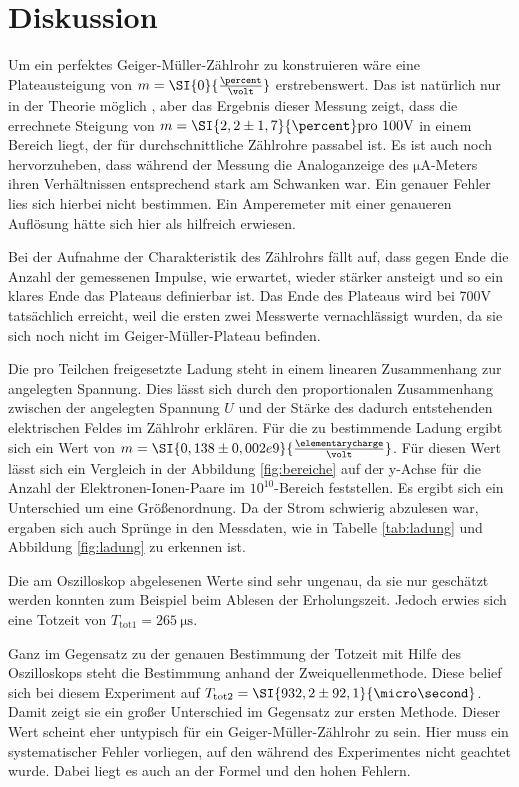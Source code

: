 \section{Diskussion}
\label{sec:Diskussion}
Um ein perfektes Geiger-Müller-Zählrohr zu konstruieren wäre eine Plateausteigung von $m = \SI{0}{\frac{\percent}{\volt}}$ erstrebenswert. Das ist natürlich nur in der Theorie möglich , aber das Ergebnis dieser Messung zeigt, dass die errechnete Steigung von $m = \SI{2,2 \pm 1,7}{\percent} \text{pro 100V}$ in einem Bereich liegt, der für durchschnittliche Zählrohre passabel ist. Es ist auch noch hervorzuheben, dass während der Messung die Analoganzeige des $\si{\micro\ampere}$-Meters ihren Verhältnissen entsprechend stark am Schwanken war. Ein genauer Fehler lies sich hierbei nicht bestimmen. Ein Amperemeter mit einer genaueren Auflösung hätte sich hier als hilfreich erwiesen. 

Bei der Aufnahme der Charakteristik des Zählrohrs fällt auf, dass gegen Ende die Anzahl der gemessenen Impulse, wie erwartet, wieder stärker ansteigt und so ein klares Ende das Plateaus definierbar ist. Das Ende des Plateaus wird bei 700V tatsächlich erreicht, weil die ersten zwei Messwerte vernachlässigt wurden, da sie sich noch nicht im Geiger-Müller-Plateau befinden.

Die pro Teilchen freigesetzte Ladung steht in einem linearen Zusammenhang zur angelegten Spannung. Dies lässt sich durch den proportionalen Zusammenhang zwischen der angelegten Spannung $U$ und der Stärke des dadurch entstehenden elektrischen Feldes im Zählrohr erklären. 
Für die zu bestimmende Ladung ergibt sich ein Wert von $m = \SI{0,138 \pm 0,002 e9}{\frac{\elementarycharge}{\volt}}$. Für diesen Wert lässt sich ein Vergleich in der Abbildung \ref{fig:bereiche} auf der y-Achse für die Anzahl der Elektronen-Ionen-Paare im $10^{10}$-Bereich feststellen. Es ergibt sich ein Unterschied um eine Größenordnung. Da der Strom schwierig abzulesen war, ergaben sich auch Sprünge in den Messdaten, wie in Tabelle \ref{tab:ladung} und Abbildung \ref{fig:ladung} zu erkennen ist. 

Die am Oszilloskop abgelesenen Werte sind sehr ungenau, da sie nur geschätzt werden konnten zum Beispiel beim Ablesen der Erholungszeit. 
Jedoch erwies sich eine Totzeit von $T_\text{tot1} = \SI{265}{\micro\second}$.

Ganz im Gegensatz zu der genauen Bestimmung der Totzeit mit Hilfe des Oszilloskops steht die Bestimmung anhand der Zweiquellenmethode. Diese belief sich bei diesem Experiment auf $T_\text{tot2} = \SI{932,2 \pm 92,1}{\micro\second}$. Damit zeigt sie ein großer Unterschied im Gegensatz zur ersten Methode. Dieser Wert scheint eher untypisch für ein Geiger-Müller-Zählrohr zu sein. Hier muss ein systematischer Fehler vorliegen, auf den während des Experimentes nicht geachtet wurde. Dabei liegt es auch an der Formel und den hohen Fehlern.


